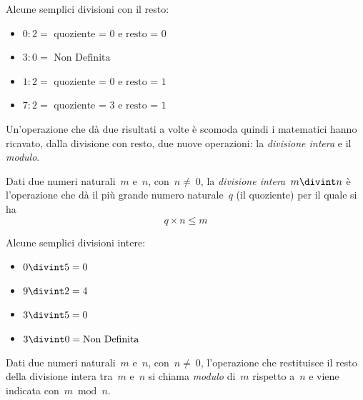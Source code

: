  \begin{esempio}{}{}
 Alcune semplici divisioni con il resto:
 \vspace{-1em}
\begin{multicols}{2}
\begin{itemize} [nosep]
\item \(0:2 = \text{ quoziente~=~0 e resto~=~0}\)
\item \(3:0 = \text{ Non Definita}\)
\item \(1:2 = \text{ quoziente~=~0 e resto~=~1}\)
\item \(7:2 = \text{ quoziente~=~3 e resto~=~1}\)
\end{itemize}
\end{multicols}
\end{esempio}

Un'operazione che dà due risultati a volte è scomoda quindi i matematici 
hanno ricavato, dalla divisione con resto, due nuove operazioni: 
la \emph{divisione intera} e il \emph{modulo}.

\begin{definizione}{}{}
Dati due numeri naturali~\(m\) e~\(n\), con~\(n\neq~0\), la 
\emph{divisione intera}~\(m\divint n\) è l'operazione che dà il più grande 
numero naturale~\(q\) (il quoziente) per il quale si ha
\[q\times n\le m\]
\end{definizione}

\begin{esempio}{}{}
Alcune semplici divisioni intere:
\vspace{-1em}
\begin{multicols}{2}
\begin{itemize} [nosep]
\item \(0 \divint 5=0\)
\item \(9 \divint 2=4\)
\item \(3 \divint 5=0\)
\item \(3 \divint 0=\text{Non Definita}\)
\end{itemize}
\end{multicols}
\end{esempio}

\begin{definizione}{}{}
Dati due numeri naturali~\(m\) e~\(n\), con~\(n\neq~0\), l'operazione che 
restituisce il resto della divisione intera tra~\(m\) e~\(n\) si chiama 
\emph{modulo} di~\(m\) rispetto a~\(n\) e viene indicata con~\(m\bmod{n}\).
\end{definizione}

